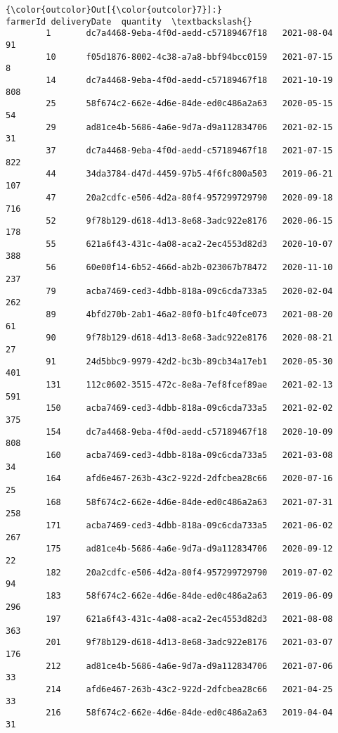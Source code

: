 \documentclass[11pt]{article}
\begin{document}
\begin{Verbatim}[commandchars=\\\{\}]
{\color{outcolor}Out[{\color{outcolor}7}]:}                                     farmerId deliveryDate  quantity  \textbackslash{}
        1       dc7a4468-9eba-4f0d-aedd-c57189467f18   2021-08-04        91   
        10      f05d1876-8002-4c38-a7a8-bbf94bcc0159   2021-07-15         8   
        14      dc7a4468-9eba-4f0d-aedd-c57189467f18   2021-10-19       808   
        25      58f674c2-662e-4d6e-84de-ed0c486a2a63   2020-05-15        54   
        29      ad81ce4b-5686-4a6e-9d7a-d9a112834706   2021-02-15        31   
        37      dc7a4468-9eba-4f0d-aedd-c57189467f18   2021-07-15       822   
        44      34da3784-d47d-4459-97b5-4f6fc800a503   2019-06-21       107   
        47      20a2cdfc-e506-4d2a-80f4-957299729790   2020-09-18       716   
        52      9f78b129-d618-4d13-8e68-3adc922e8176   2020-06-15       178   
        55      621a6f43-431c-4a08-aca2-2ec4553d82d3   2020-10-07       388   
        56      60e00f14-6b52-466d-ab2b-023067b78472   2020-11-10       237   
        79      acba7469-ced3-4dbb-818a-09c6cda733a5   2020-02-04       262   
        89      4bfd270b-2ab1-46a2-80f0-b1fc40fce073   2021-08-20        61   
        90      9f78b129-d618-4d13-8e68-3adc922e8176   2020-08-21        27   
        91      24d5bbc9-9979-42d2-bc3b-89cb34a17eb1   2020-05-30       401   
        131     112c0602-3515-472c-8e8a-7ef8fcef89ae   2021-02-13       591   
        150     acba7469-ced3-4dbb-818a-09c6cda733a5   2021-02-02       375   
        154     dc7a4468-9eba-4f0d-aedd-c57189467f18   2020-10-09       808   
        160     acba7469-ced3-4dbb-818a-09c6cda733a5   2021-03-08        34   
        164     afd6e467-263b-43c2-922d-2dfcbea28c66   2020-07-16        25   
        168     58f674c2-662e-4d6e-84de-ed0c486a2a63   2021-07-31       258   
        171     acba7469-ced3-4dbb-818a-09c6cda733a5   2021-06-02       267   
        175     ad81ce4b-5686-4a6e-9d7a-d9a112834706   2020-09-12        22   
        182     20a2cdfc-e506-4d2a-80f4-957299729790   2019-07-02        94   
        183     58f674c2-662e-4d6e-84de-ed0c486a2a63   2019-06-09       296   
        197     621a6f43-431c-4a08-aca2-2ec4553d82d3   2021-08-08       363   
        201     9f78b129-d618-4d13-8e68-3adc922e8176   2021-03-07       176   
        212     ad81ce4b-5686-4a6e-9d7a-d9a112834706   2021-07-06        33   
        214     afd6e467-263b-43c2-922d-2dfcbea28c66   2021-04-25        33   
        216     58f674c2-662e-4d6e-84de-ed0c486a2a63   2019-04-04        31   

\end{Verbatim}
\end{document}
